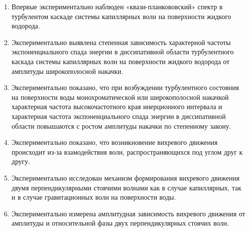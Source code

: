{}
\begin{enumerate}
	\item Впервые экспериментально наблюден «квази-планкововский» спектр в турбулентом каскаде системы капиллярных волн на поверхности жидкого водорода.
	\item Экспериментально выявлена степенная зависимость характерной частоты экспоненциального спада энергии в диссипативной области турбулентного каскада системы капиллярных волн на поверхности жидкого водорода от амплитуды широкополосной накачки.
	\item Экспериментально показано, что при возбуждении турбулентного состояния на поверхности воды монохроматической или широкополосной накачкой характерная частота высокочастотного края инерционного интервала и характерная частота экспоненциального спада энергии в диссипативной области повышаются с ростом амплитуды накачки по степенному закону.%

	\item Экспериментально показано, что возникновение вихревого движения происходит из-за взамодействия волн, распространяющихся под углом друг к другу.
	\item Экспериментально исследован механизм формирования вихревого движения двумя перпендикулярными стоячими волнами как в случае капиллярных, так и в случае гравитационных волн на поверхности воды.
	\item Экспериментально измерена амплитудная зависимость вихревого движения от амплитуды и относительной фазы двух перпендикулярных стоячих волн.
\end{enumerate}


